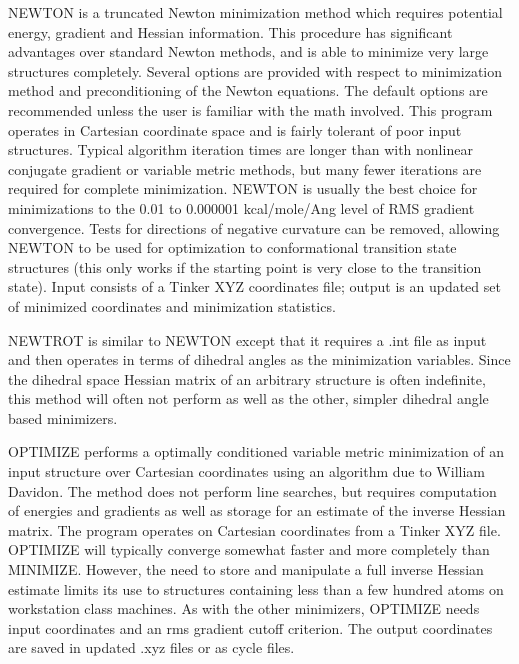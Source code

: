 \documentclass[letterpaper,11pt,english]{sphinxmanual}
\begin{document}
\sphinxAtStartPar
NEWTON is a truncated Newton minimization method which requires potential energy, gradient and Hessian information. This procedure has significant advantages over standard Newton methods, and is able to minimize very large structures completely. Several options are provided with respect to minimization method and preconditioning of the Newton equations. The default options are recommended unless the user is familiar with the math involved. This program operates in Cartesian coordinate space and is fairly tolerant of poor input structures. Typical algorithm iteration times are longer than with nonlinear conjugate gradient or variable metric methods, but many fewer iterations are required for complete minimization. NEWTON is usually the best choice for minimizations to the 0.01 to 0.000001 kcal/mole/Ang level of RMS gradient convergence. Tests for directions of negative curvature can be removed, allowing NEWTON to be used for optimization to conformational transition state structures (this only works if the starting point is very close to the transition state). Input consists of a Tinker XYZ coordinates file; output is an updated set of minimized coordinates and minimization statistics.

\sphinxAtStartPar
{}

\sphinxAtStartPar
NEWTROT is similar to NEWTON except that it requires a .int file as input and then operates in terms of dihedral angles as the minimization variables. Since the dihedral space Hessian matrix of an arbitrary structure is often indefinite, this method will often not perform as well as the other, simpler dihedral angle based minimizers.

\sphinxAtStartPar
{}

\sphinxAtStartPar
OPTIMIZE performs a optimally conditioned variable metric minimization of an input structure over Cartesian coordinates using an algorithm due to William Davidon. The method does not perform line searches, but requires computation of energies and gradients as well as storage for an estimate of the inverse Hessian matrix. The program operates on Cartesian coordinates from a Tinker XYZ file. OPTIMIZE will typically converge somewhat faster and more completely than MINIMIZE. However, the need to store and manipulate a full inverse Hessian estimate limits its use to structures containing less than a few hundred atoms on workstation class machines. As with the other minimizers, OPTIMIZE needs input coordinates and an rms gradient cutoff criterion. The output coordinates are saved in updated .xyz files or as cycle files.
\end{document}
